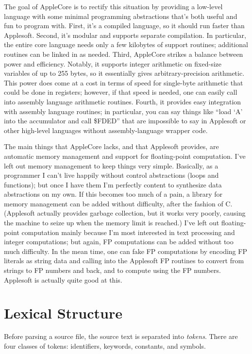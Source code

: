 \documentclass[10pt]{article}
\begin{document}
The goal of AppleCore is to rectify this situation by providing a
low-level language with some minimal programming abstractions that's
both useful and fun to program with.  First, it's a compiled language,
so it should run faster than Applesoft.  Second, it's modular and
supports separate compilation.  In particular, the entire core
language needs only a few kilobytes of support routines; additional
routines can be linked in as needed.  Third, AppleCore strikes a
balance between power and efficiency.  Notably, it supports integer
arithmetic on fixed-size variables of up to 255 bytes, so it
essentially gives arbitrary-precision arithmetic.  This power does
come at a cost in terms of speed for single-byte arithmetic that could
be done in registers; however, if that speed is needed, one can easily
call into assembly language arithmetic routines.  Fourth, it provides
easy integration with assembly language routines; in particular, you
can say things like ``load `A' into the accumulator and call \$FDED''
that are impossible to say in Applesoft or other high-level languages
without assembly-language wrapper code.

The main things that AppleCore lacks, and that Applesoft provides, are
automatic memory management and support for floating-point
computation.  I've left out memory management to keep things very
simple.  Basically, as a programmer I can't live happily without
control abstractions (loops and functions); but once I have them I'm
perfectly content to synthesize data abstractions on my own.  If this
becomes too much of a pain, a library for memory management can be
added without difficulty, after the fashion of C.  (Applesoft actually
provides garbage collection, but it works very poorly, causing the
machine to seize up when the memory limit is reached.)  I've left out
floating-point computation mainly because I'm most interested in text
processing and integer computations; but again, FP computations can be
added without too much difficulty.  In the mean time, one can fake FP
computations by encoding FP literals as string data and calling into
the Applesoft FP routines to convert from strings to FP numbers and
back, and to compute using the FP numbers.  Applesoft is actually
quite good at this.

\section{Lexical Structure}

Before parsing a source file, the source text is separated into
\emph{tokens}.  There are four classes of tokens: identifiers,
keywords, constants, and symbols.
\end{document}
